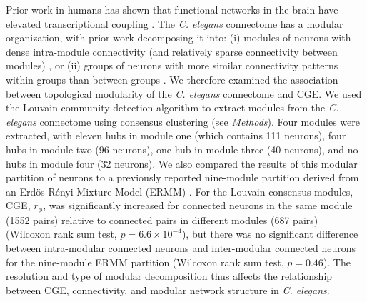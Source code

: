 \documentclass[10pt,letterpaper]{article}
\begin{document}
{Prior work in humans has shown that functional networks in the brain have elevated transcriptional coupling \cite{Richiardi2015}.
The \emph{C. elegans} connectome has a modular organization, with prior work decomposing it into:
(i) modules of neurons with dense intra-module connectivity (and relatively sparse connectivity between modules) \cite{Kim:2014bu, Pan:2010jt, Bassett2010}, or
(ii) groups of neurons with more similar connectivity patterns within groups than between groups \cite{Achacoso:1992ay, Pavlovic:2014gx}.
We therefore examined the association between topological modularity of the \emph{C. elegans} connectome and CGE.
We used the Louvain community detection algorithm \cite{Blondel:2008do} to extract modules from the \emph{C. elegans} connectome using consensus clustering (see \textit{Methods}).
Four modules were extracted, with eleven hubs in module one (which contains 111 neurons), four hubs in module two (96 neurons), one hub in module three (40 neurons), and no hubs in module four (32 neurons).
We also compared the results of this modular partition of neurons to a previously reported nine-module partition derived from an Erd\"os-R\'enyi Mixture Model (ERMM) \cite{Pavlovic:2014gx}.
For the Louvain consensus modules, CGE, $r_\phi$, was significantly increased for connected neurons in the same module (1552 pairs) relative to connected pairs in different modules (687 pairs) (Wilcoxon rank sum test, $p = 6.6 \times 10^{-4}$), but there was no significant difference between intra-modular connected neurons and inter-modular connected neurons for the nine-module ERMM partition (Wilcoxon rank sum test, $p = 0.46$).
The resolution and type of modular decomposition thus affects the relationship between CGE, connectivity, and modular network structure in \emph{C. elegans}.
}
\end{document}

